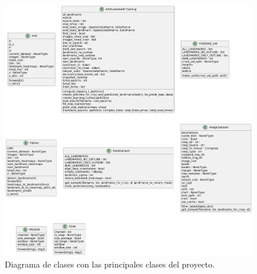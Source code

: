 \newpage

\begin{figure}[!h]
    \centering
    \includegraphics[width=0.99\textwidth]{img/diagrama_clases.png}
    \caption{Diagrama de clases con las principales clases del proyecto.}
    \label{fig:Diagrama_clases}
\end{figure}

\medskip

